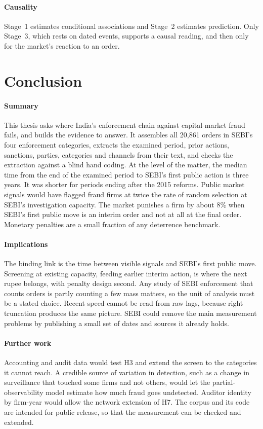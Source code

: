 \documentclass[letterpaper,11pt,leqno]{article}
\begin{document}
\paragraph{Causality} Stage~1 estimates conditional associations and Stage~2 estimates prediction. Only Stage~3, which rests on dated events, supports a causal reading, and then only for the market's reaction to an order.

\section{Conclusion}\label{s:ccl}

\paragraph{Summary} This thesis asks where India's enforcement chain against capital-market fraud fails, and builds the evidence to answer. It assembles all 20,861 orders in SEBI's four enforcement categories, extracts the examined period, prior actions, sanctions, parties, categories and channels from their text, and checks the extraction against a blind hand coding. At the level of the matter, the median time from the end of the examined period to SEBI's first public action is three years. It was shorter for periods ending after the 2015 reforms. Public market signals would have flagged fraud firms at twice the rate of random selection at SEBI's investigation capacity. The market punishes a firm by about 8\% when SEBI's first public move is an interim order and not at all at the final order. Monetary penalties are a small fraction of any deterrence benchmark.

\paragraph{Implications} The binding link is the time between visible signals and SEBI's first public move. Screening at existing capacity, feeding earlier interim action, is where the next rupee belongs, with penalty design second. Any study of SEBI enforcement that counts orders is partly counting a few mass matters, so the unit of analysis must be a stated choice. Recent speed cannot be read from raw lags, because right truncation produces the same picture. SEBI could remove the main measurement problems by publishing a small set of dates and sources it already holds.

\paragraph{Further work} Accounting and audit data would test H3 and extend the screen to the categories it cannot reach. A credible source of variation in detection, such as a change in surveillance that touched some firms and not others, would let the partial-observability model estimate how much fraud goes undetected. Auditor identity by firm-year would allow the network extension of H7. The corpus and its code are intended for public release, so that the measurement can be checked and extended.
\end{document}
